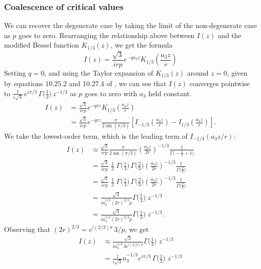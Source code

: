 \documentclass{article}
\theoremstyle{definition}
\theoremstyle{plain}
\newenvironment{verify}{\color{ForestGreen}}{\color{black}}
\begin{document}
\subsubsection{Coalescence of critical values}
We can recover the degenerate case by taking the limit of the non-degenerate case as $p$ goes to zero. Rearranging the relationship above between $I(z)$ and the modified Bessel function $K_{1/3}(z)$, we get the formula
\[ I(z) = \frac{\sqrt{3}}{irp} e^{-qa_3z} K_{1/3}\left(\frac{a_3 z}{r}\right) \]
Setting $q=0$, and using the Taylor expansion of $K_{1/3}(z)$ around $z = 0$, given by equations 10.25.2 and 10.27.4 of \cite{dlmf}, we can see that $I(z)$ converges pointwise to $\tfrac{1}{i\sqrt{3}}\,e^{i\pi/3}\,\Gamma\big(\tfrac{1}{3}\big)\,z^{-1/3}$ as $p$ goes to zero with $a_3$ held constant.
\begin{verify}
\begin{align*}
I(z) & = \frac{\sqrt{3}}{irp} e^{-qrz} K_{1/3}\left(\frac{a_3 z}{r}\right) \\
& = \frac{\sqrt{3}}{irp} e^{-qrz} \frac{\pi}{2 \sin(\pi/3)} \left[ I_{-1/3}\left(\frac{a_3 z}{r}\right) - I_{1/3}\left(\frac{a_3 z}{r} \right)\right].
\end{align*}
We take the lowest-order term, which is the leading term of $I_{-1/3}(a_3 z / r)$:
\begin{align*}
I(z) & \approx \frac{\sqrt{3}}{irp} \frac{\pi}{2 \sin(\pi/3)} \left(\frac{a_3 z}{2r}\right)^{-1/3} \frac{1}{\Gamma\big(-\tfrac{1}{3} + 1\big)} \\
& = \frac{\sqrt{3}}{irp}\;\frac{1}{2}\;\Gamma\big(\tfrac{1}{3}\big)\,\Gamma\big(\tfrac{2}{3}\big) \left(\frac{a_3 z}{2r}\right)^{-1/3} \frac{1}{\Gamma\big(\tfrac{2}{3}\big)} \\
& = \frac{\sqrt{3}}{irp}\;\frac{1}{2}\;\Gamma\big(\tfrac{1}{3}\big)\,\Gamma\big(\tfrac{2}{3}\big) \left(\frac{a_3 z}{2r}\right)^{-1/3} \frac{1}{\Gamma\big(\tfrac{2}{3}\big)} \\
& = \frac{\sqrt{3}}{i a_3^{1/3} (2r)^{2/3} p} \Gamma\big(\tfrac{1}{3}\big)\;z^{-1/3} \\
& = \frac{\sqrt{3}}{i a_3^{1/3} (2r)^{2/3} p} \Gamma\big(\tfrac{1}{3}\big)\;z^{-1/3}.
\end{align*}
Observing that $(2r)^{2/3} = e^{i(2/3)\pi }\,3/p$, we get
\begin{align*}
I(z) & \approx \frac{\sqrt{3}}{i a_3^{1/3}\,3e^{i(2/3)\pi}} \Gamma\big(\tfrac{1}{3}\big)\;z^{-1/3} \\
& = \frac{1}{i\sqrt{3}} a_3^{-1/3} e^{i\pi/3}\,\Gamma\big(\tfrac{1}{3}\big)\;z^{-1/3}

\end{align*}
\end{verify}
\end{document}
